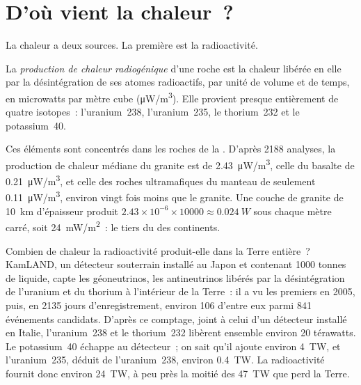 \section{D'où vient la chaleur~?}

La chaleur a deux sources. La première est la radioactivité.

\begin{definition}\label{def:g12:internal-heat:heat-production}
La \emph{production de chaleur radiogénique}
d'une roche est la chaleur libérée en elle par la désintégration de ses
atomes radioactifs, par unité de volume et de temps, en microwatts par
mètre cube (\unit{\micro W/m^3}). Elle provient presque entièrement de
quatre isotopes~: l'uranium~238, l'uranium~235, le thorium~232 et le
potassium~40.
\end{definition}

Ces éléments sont concentrés dans les roches de la .
D'après 2188 analyses, la production de chaleur médiane du granite est de
\qty{2.43}{\micro W/m^3}, celle du basalte de \qty{0.21}{\micro W/m^3}, et
celle des roches ultramafiques du manteau de seulement
\qty{0.11}{\micro W/m^3}, environ vingt fois moins que le granite. Une
couche de granite de \qty{10}{km} d'épaisseur produit
$2.43 \times 10^{-6} \times \num{10000} \approx \qty{0.024}{W}$ sous chaque
mètre carré, soit \qty{24}{mW/m^2}~: le tiers du  des
continents.

Combien de chaleur la radioactivité produit-elle dans la Terre entière~?
KamLAND, un détecteur souterrain installé au Japon et contenant 1000 tonnes
de liquide, capte les géoneutrinos, les antineutrinos libérés par la
désintégration de l'uranium et du thorium à l'intérieur de la Terre~: il a
vu les premiers en 2005, puis, en 2135 jours d'enregistrement, environ 106
d'entre eux parmi 841 événements candidats. D'après ce comptage, joint à
celui d'un détecteur installé en Italie, l'uranium~238 et le thorium~232
libèrent ensemble environ 20 térawatts. Le potassium~40 échappe au
détecteur~; on sait qu'il ajoute environ \qty{4}{TW}, et l'uranium~235,
déduit de l'uranium~238, environ \qty{0.4}{TW}. La radioactivité fournit
donc environ \qty{24}{TW}, à peu près la moitié des \qty{47}{TW} que perd
la Terre.


